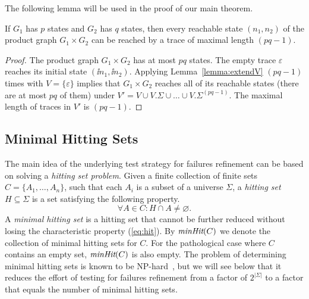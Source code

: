 The following lemma will be used in the proof of our main theorem.
\begin{lemma}\label{lemma:reachproduc}
If $G_1$ has $p$ states and $G_2$ has $q$ states, then every reachable state
$(n_1,n_2)$ of the product graph $G_1\times G_2$ can be reached by a trace
of maximal length $(pq-1)$.
\end{lemma}
\begin{proof}
The product graph $G_1\times G_2$ has at most $pq$ states. The empty trace $\varepsilon$
reaches its initial state $(\ii n_1,\ii n_2)$. Applying Lemma~\ref{lemma:extendV}
$(pq-1)$ times with $V=\{\varepsilon \}$ implies that $G_1\times G_2$ reaches
all of its reachable states (there are at most $pq$ of them) under
$V' = V \cup V.\Sigma\cup\dots \cup V.\Sigma^{(pq-1)}$. The maximal length of traces in
$V'$ is $(pq-1)$.
\xbox
\end{proof}


\subsection{Minimal Hitting Sets}
\label{sec:hit}

The main idea of the underlying test strategy for failures refinement can be
based on solving a \emph{hitting set problem}. Given a finite collection of
finite sets $C = \{ A_1,\dots,A_n\}$, such that each $A_i$ is a subset of a
universe $\Sigma$, a \emph{hitting set} $H\subseteq\Sigma$ is a set
satisfying the following property.
%
\begin{equation}
  \label{eq:hit}
  \forall A\in C: H\cap A \neq\varnothing.
\end{equation}
%
A \emph{minimal hitting set} is a hitting set that cannot be further reduced
without losing the characteristic property (\ref{eq:hit}). By $\text{\it minHit}(C)$ we denote the collection of minimal hitting sets for $C$. For the pathological case where $C$ contains an empty set, $\text{\it minHit}(C)$ is also empty.
 The problem of
determining minimal hitting sets is known to be %
NP-hard~\cite{5533149}, but we will see below that it reduces the
effort of testing for failures refinement from a factor of $2^{|\Sigma|}$ to a
factor that equals the number of minimal hitting sets.


 

